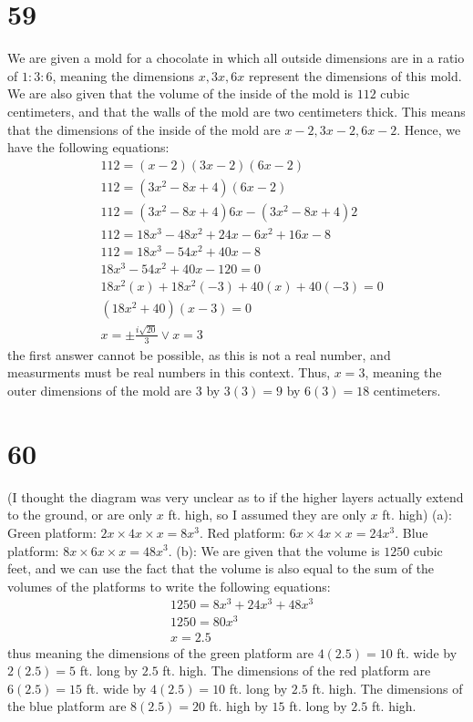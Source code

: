 \documentclass{article}
\theoremstyle{definition}
\begin{document}
\section*{59}
We are given a mold for a chocolate in which all outside dimensions are in a ratio of $1:3:6$, meaning the dimensions $x,3x,6x$ represent the dimensions 
of this mold. We are also given that the volume of the inside of the mold is $112$ cubic centimeters, and that the walls of the mold are two 
centimeters thick. This means that the dimensions of the inside of the mold are $x-2,3x-2,6x-2$. Hence, we have the following equations:
\[
\begin{array}{rl}
	& 112=(x-2)(3x-2)(6x-2) \\
	& 112=(3x^2-8x+4)(6x-2) \\
	& 112=(3x^2-8x+4)6x-(3x^2-8x+4)2 \\
	& 112=18x^3-48x^2+24x-6x^2+16x-8 \\
	& 112=18x^3-54x^2+40x-8 \\
	& 18x^3-54x^2+40x-120=0 \\
	& 18x^2(x)+18x^2(-3)+40(x)+40(-3)=0 \\
	& (18x^2+40)(x-3)=0 \\
	& x=\pm\frac{i\sqrt{20}}{3}\vee x=3
\end{array}
\]
the first answer cannot be possible, as this is not a real number, and measurments must be real numbers in this context. Thus, $x=3$, meaning 
the outer dimensions of the mold are $3$ by $3(3)=9$ by $6(3)=18$ centimeters.


\section*{60}
(I thought the diagram was very unclear as to if the higher layers actually extend to the ground, or are only $x$ ft. high, so I assumed they are only 
$x$ ft. high)\newline
(a): Green platform: $2x\times 4x\times x=8x^3$. Red platform: $6x\times 4x\times x=24x^3$. Blue platform: $8x\times 6x\times x=48x^3$.\newline
(b): We are given that the volume is $1250$ cubic feet, and we can use the fact that the volume is also equal to the sum of the volumes of the platforms 
to write the following equations:
\[
\begin{array}{rl}
	& 1250=8x^3+24x^3+48x^3 \\
	& 1250=80x^3 \\
	& x=2.5
\end{array}
\]
thus meaning the dimensions of the green platform are $4(2.5)=10$ ft. wide by $2(2.5)=5$ ft. long by $2.5$ ft. high. The dimensions of the red platform are 
$6(2.5)=15$ ft. wide by $4(2.5)=10$ ft. long by $2.5$ ft. high. The dimensions of the blue platform are $8(2.5)=20$ ft. high by $15$ ft. long by 
$2.5$ ft. high.
\end{document}
